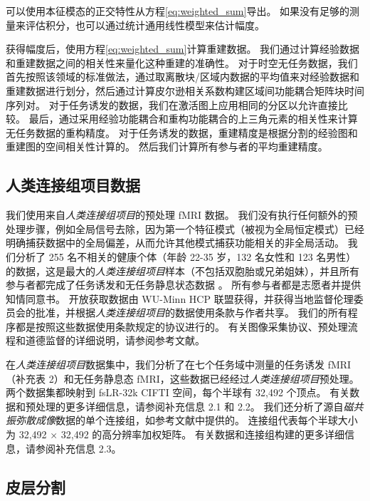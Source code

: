 \documentclass[lang=cn,a4paper,newtx]{elegantpaper}
\begin{document}
可以使用本征模态的正交特性从方程\ref{eq:weighted_sum}导出\cite{robinson2021determination,courant2008methods}。
如果没有足够的测量来评估积分，也可以通过统计通用线性模型来估计幅度。


获得幅度后，使用方程\ref{eq:weighted_sum}计算重建数据。
我们通过计算经验数据和重建数据之间的相关性来量化这种重建的准确性。
对于时空无任务数据，我们首先按照该领域的标准做法，通过取离散块/区域内数据的平均值来对经验数据和重建数据进行划分\cite{eickhoff2018imaging}，然后通过计算皮尔逊相关系数构建区域间功能耦合矩阵块时间序列对。
对于任务诱发的数据，我们在激活图上应用相同的分区以允许直接比较。
最后，通过采用经验功能耦合和重构功能耦合的上三角元素的相关性来计算无任务数据的重构精度。
对于任务诱发的数据，重建精度是根据分割的经验图和重建图的空间相关性计算的。
然后我们计算所有参与者的平均重建精度。



\subsection{人类连接组项目数据} \label{sec:HCP_data}

我们使用来自\textit{人类连接组项目}\cite{van2013wu}的预处理 fMRI 数据。
我们没有执行任何额外的预处理步骤，例如全局信号去除，因为第一个特征模式（被视为全局恒定模式）已经明确捕获数据中的全局偏差，从而允许其他模式捕获功能相关的非全局活动。
我们分析了 255 名不相关的健康个体（年龄 22-35 岁，132 名女性和 123 名男性）的数据，这是最大的\textit{人类连接组项目}样本（不包括双胞胎或兄弟姐妹），并且所有参与者都完成了任务诱发和无任务静息状态数据 。
所有参与者都是志愿者并提供知情同意书。 开放获取数据由 WU-Minn HCP 联盟获得，并获得当地监督伦理委员会的批准，并根据\textit{人类连接组项目}的数据使用条款与作者共享。
我们的所有程序都是按照这些数据使用条款规定的协议进行的。 有关图像采集协议、预处理流程和道德监督的详细说明，请参阅参考文献\cite{van2013wu,barch2013function}。


在\textit{人类连接组项目}数据集中，我们分析了在七个任务域中测量的任务诱发 fMRI（补充表 2）和无任务静息态 fMRI，这些数据已经经过\textit{人类连接组项目}预处理。
两个数据集都映射到 fsLR-32k CIFTI 空间，每个半球有 32,492 个顶点。
有关数据和预处理的更多详细信息，请参阅补充信息 2.1 和 2.2。
我们还分析了源自\textit{磁共振弥散成像}数据的单个连接组，如参考文献中提供的\cite{tian2021high}。
连接组代表每个半球大小为 32,492 × 32,492 的高分辨率加权矩阵。
有关数据和连接组构建的更多详细信息，请参阅补充信息 2.3。


\subsection{皮层分割} \label{sec:cortical_parcellations}
\end{document}
